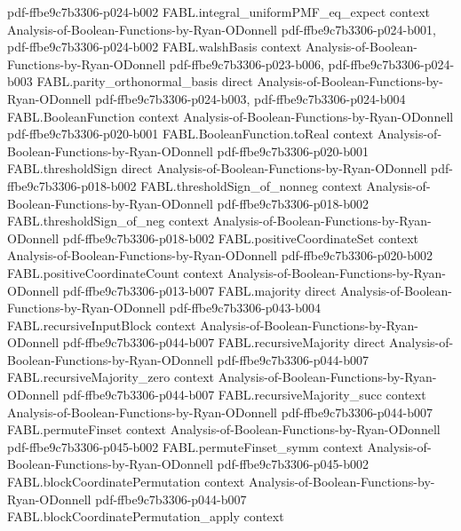 \begin{theorem}
  {pdf-ffbe9c7b3306-p024-b002}
\proofstep
  {FABL.integral_uniformPMF_eq_expect}
  {context}
  {Analysis-of-Boolean-Functions-by-Ryan-ODonnell}
  {pdf-ffbe9c7b3306-p024-b001,
    pdf-ffbe9c7b3306-p024-b002}
\proofstep
  {FABL.walshBasis}
  {context}
  {Analysis-of-Boolean-Functions-by-Ryan-ODonnell}
  {pdf-ffbe9c7b3306-p023-b006,
    pdf-ffbe9c7b3306-p024-b003}
\proofstep
  {FABL.parity_orthonormal_basis}
  {direct}
  {Analysis-of-Boolean-Functions-by-Ryan-ODonnell}
  {pdf-ffbe9c7b3306-p024-b003,
    pdf-ffbe9c7b3306-p024-b004}
\proofstep
  {FABL.BooleanFunction}
  {context}
  {Analysis-of-Boolean-Functions-by-Ryan-ODonnell}
  {pdf-ffbe9c7b3306-p020-b001}
\proofstep
  {FABL.BooleanFunction.toReal}
  {context}
  {Analysis-of-Boolean-Functions-by-Ryan-ODonnell}
  {pdf-ffbe9c7b3306-p020-b001}
\proofstep
  {FABL.thresholdSign}
  {direct}
  {Analysis-of-Boolean-Functions-by-Ryan-ODonnell}
  {pdf-ffbe9c7b3306-p018-b002}
\proofstep
  {FABL.thresholdSign_of_nonneg}
  {context}
  {Analysis-of-Boolean-Functions-by-Ryan-ODonnell}
  {pdf-ffbe9c7b3306-p018-b002}
\proofstep
  {FABL.thresholdSign_of_neg}
  {context}
  {Analysis-of-Boolean-Functions-by-Ryan-ODonnell}
  {pdf-ffbe9c7b3306-p018-b002}
\proofstep
  {FABL.positiveCoordinateSet}
  {context}
  {Analysis-of-Boolean-Functions-by-Ryan-ODonnell}
  {pdf-ffbe9c7b3306-p020-b002}
\proofstep
  {FABL.positiveCoordinateCount}
  {context}
  {Analysis-of-Boolean-Functions-by-Ryan-ODonnell}
  {pdf-ffbe9c7b3306-p013-b007}
\proofstep
  {FABL.majority}
  {direct}
  {Analysis-of-Boolean-Functions-by-Ryan-ODonnell}
  {pdf-ffbe9c7b3306-p043-b004}
\proofstep
  {FABL.recursiveInputBlock}
  {context}
  {Analysis-of-Boolean-Functions-by-Ryan-ODonnell}
  {pdf-ffbe9c7b3306-p044-b007}
\proofstep
  {FABL.recursiveMajority}
  {direct}
  {Analysis-of-Boolean-Functions-by-Ryan-ODonnell}
  {pdf-ffbe9c7b3306-p044-b007}
\proofstep
  {FABL.recursiveMajority_zero}
  {context}
  {Analysis-of-Boolean-Functions-by-Ryan-ODonnell}
  {pdf-ffbe9c7b3306-p044-b007}
\proofstep
  {FABL.recursiveMajority_succ}
  {context}
  {Analysis-of-Boolean-Functions-by-Ryan-ODonnell}
  {pdf-ffbe9c7b3306-p044-b007}
\proofstep
  {FABL.permuteFinset}
  {context}
  {Analysis-of-Boolean-Functions-by-Ryan-ODonnell}
  {pdf-ffbe9c7b3306-p045-b002}
\proofstep
  {FABL.permuteFinset_symm}
  {context}
  {Analysis-of-Boolean-Functions-by-Ryan-ODonnell}
  {pdf-ffbe9c7b3306-p045-b002}
\proofstep
  {FABL.blockCoordinatePermutation}
  {context}
  {Analysis-of-Boolean-Functions-by-Ryan-ODonnell}
  {pdf-ffbe9c7b3306-p044-b007}
\proofstep
  {FABL.blockCoordinatePermutation_apply}
  {context}

\end{theorem}
